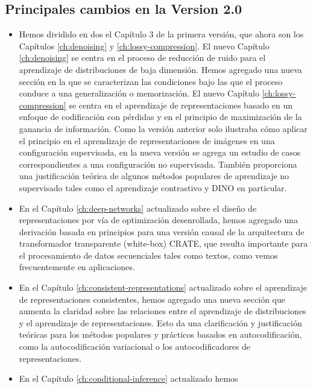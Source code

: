 \documentclass[../../book-main_es.tex]{subfiles}
\begin{document}
\subsection*{Principales cambios en la Version 2.0}
\begin{itemize}
    \item Hemos dividido en dos el Capítulo 3 de la primera versión, que ahora
        son los Capítulos \ref{ch:denoising} y \ref{ch:lossy-compression}. El
        nuevo Capítulo \ref{ch:denoising} se centra en el proceso de reducción 
        de ruido para el aprendizaje de distribuciones de baja dimensión.
        Hemos agregado una nueva sección en la que se caracterizan las 
        condiciones bajo las que el proceso conduce a una generalización o
        memorización. El nuevo Capítulo \ref{ch:lossy-compression} se centra
        en el aprendizaje de representaciones basado en un enfoque de 
        codificación con pérdidas y en el principio de maximización de la 
        ganancia de información. Como la versión anterior solo
        ilustraba cómo aplicar el principio en el aprendizaje de 
        representaciones de imágenes en una configuración supervisada, en la nueva versión 
        se agrega un estudio de casos correspondientes a una configuración no supervisada.
        También proporciona una justificación teórica de algunos métodos populares 
        de aprendizaje no supervisado tales como el aprendizaje contrastivo 
        y DINO en particular.
    \item En el Capítulo \ref{ch:deep-networks} actualizado sobre el diseño
        de representaciones por vía de optimización desenrollada, hemos agregado
        una derivación basada en principios para una versión causal de la arquitectura 
        de transformador transparente (white-box) CRATE, que resulta importante para el
        procesamiento de datos secuenciales tales como textos, como vemos
        frecuentemente en aplicaciones.
    \item En el Capítulo \ref{ch:consistent-representations} actualizado 
        sobre el aprendizaje de representaciones consistentes, hemos agregado 
        una nueva sección que aumenta la claridad sobre las relaciones entre
        el aprendizaje de distribuciones y el aprendizaje de representaciones. Esto da
        una clarificación y justificación teóricas para los métodos populares
        y prácticos basados en autocodificación, como la autocodificación
        variacional o los autocodificadores de representaciones. 
    \item En el Capítulo \ref{ch:conditional-inference} actualizado hemos

\end{itemize}
\end{document}
